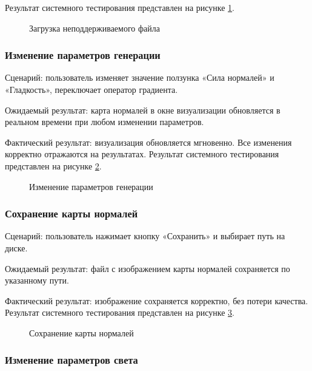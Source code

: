 Результат системного тестирования представлен на рисунке \ref{testnoimage:image}.

\begin{figure}[H]
	\caption{Загрузка неподдерживаемого файла}
	\label{testnoimage:image}
\end{figure}

\subsubsection{Изменение параметров генерации}

Сценарий: пользователь изменяет значение ползунка «Сила нормалей» и «Гладкость», переключает оператор градиента.

Ожидаемый результат: карта нормалей в окне визуализации обновляется в реальном времени при любом изменении параметров.

Фактический результат: визуализация обновляется мгновенно. Все изменения корректно отражаются на результатах.
\newpage
Результат системного тестирования представлен на рисунке \ref{testupstr:image}.

\begin{figure}[H]
	\caption{Изменение параметров генерации}
	\label{testupstr:image}
\end{figure}

\subsubsection{Сохранение карты нормалей}

Сценарий: пользователь нажимает кнопку «Сохранить» и выбирает путь на диске.

Ожидаемый результат: файл с изображением карты нормалей сохраняется по указанному пути.

Фактический результат: изображение сохраняется корректно, без потери качества.
\newpage
Результат системного тестирования представлен на рисунке \ref{testsavenm:image}.

\begin{figure}[H]
	\caption{Сохранение карты нормалей}
	\label{testsavenm:image}
\end{figure}

\subsubsection{Изменение параметров света}

